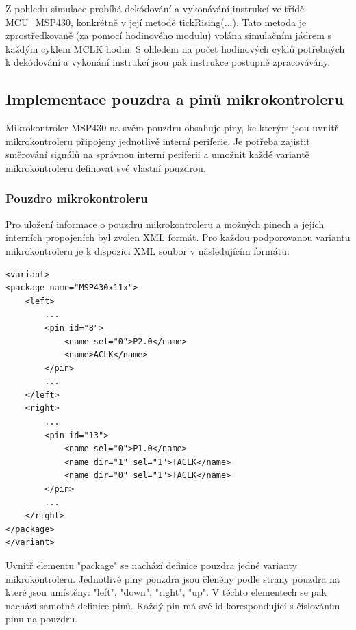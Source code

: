 Z pohledu simulace probíhá dekódování a vykonávání instrukcí ve třídě MCU\_MSP430, konkrétně v její metodě tickRising(...). Tato metoda je zprostředkovaně (za pomocí hodinového modulu) volána simulačním jádrem s každým cyklem MCLK hodin. S ohledem na počet hodinových cyklů potřebných k dekódování a vykonání instrukcí jsou pak instrukce postupně zpracovávány.

\subsection{Implementace pouzdra a pinů mikrokontroleru}

Mikrokontroler MSP430 na svém pouzdru obsahuje piny, ke kterým jsou uvnitř mikrokontroleru připojeny jednotlivé interní periferie. Je potřeba zajistit směrování signálů na správnou interní periferii a umožnit každé variantě mikrokontroleru definovat své vlastní pouzdrou.

\subsubsection{Pouzdro mikrokontroleru}

Pro uložení informace o pouzdru mikrokontroleru a možných pinech a jejich interních propojeních byl zvolen XML formát. Pro každou podporovanou variantu mikrokontroleru je k dispozici XML soubor v následujícím formátu:
\begin{lstlisting}
<variant>
<package name="MSP430x11x">
	<left>
		...
		<pin id="8">
			<name sel="0">P2.0</name>
			<name>ACLK</name>
		</pin>
		...
	</left>
	<right>
		...
		<pin id="13">
			<name sel="0">P1.0</name>
			<name dir="1" sel="1">TACLK</name>
			<name dir="0" sel="1">TACLK</name>
		</pin>
		...
	</right>
</package>
</variant>
\end{lstlisting}

Uvnitř elementu "package" se nachází definice pouzdra jedné varianty mikrokontroleru. Jednotlivé piny pouzdra jsou členěny podle strany pouzdra na které jsou umístěny: "left", "down", "right", "up". V těchto elementech se pak nachází samotné definice pinů. Každý pin má své id korespondující s číslováním pinu na pouzdru.

